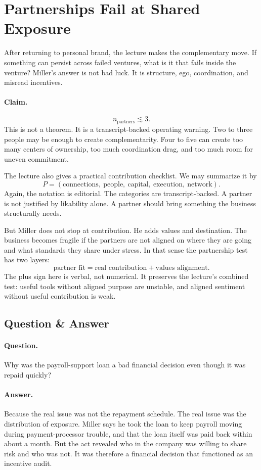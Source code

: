 \documentclass[11pt,oneside]{book}
\begin{document}
\section{Partnerships Fail at Shared Exposure}

After returning to personal brand, the lecture makes the complementary move. If something can persist across failed ventures, what is it that fails inside the venture? Miller's answer is not bad luck. It is structure, ego, coordination, and misread incentives.

\paragraph{Claim.}
\[
n_{\text{partners}} \lesssim 3.
\]
This is not a theorem. It is a transcript-backed operating warning. Two to three people may be enough to create complementarity. Four to five can create too many centers of ownership, too much coordination drag, and too much room for uneven commitment.

The lecture also gives a practical contribution checklist. We may summarize it by
\[
P=(\text{connections},\ \text{people},\ \text{capital},\ \text{execution},\ \text{network}).
\]
Again, the notation is editorial. The categories are transcript-backed. A partner is not justified by likability alone. A partner should bring something the business structurally needs.

But Miller does not stop at contribution. He adds values and destination. The business becomes fragile if the partners are not aligned on where they are going and what standards they share under stress. In that sense the partnership test has two layers:
\[
\text{partner fit}
=
\text{real contribution}
+
\text{values alignment}.
\]
The plus sign here is verbal, not numerical. It preserves the lecture's combined test: useful tools without aligned purpose are unstable, and aligned sentiment without useful contribution is weak.

\subsection{Question \& Answer}

\paragraph{Question.}
Why was the payroll-support loan a bad financial decision even though it was repaid quickly?

\paragraph{Answer.}
Because the real issue was not the repayment schedule. The real issue was the distribution of exposure. Miller says he took the loan to keep payroll moving during payment-processor trouble, and that the loan itself was paid back within about a month. But the act revealed who in the company was willing to share risk and who was not. It was therefore a financial decision that functioned as an incentive audit.
\end{document}
